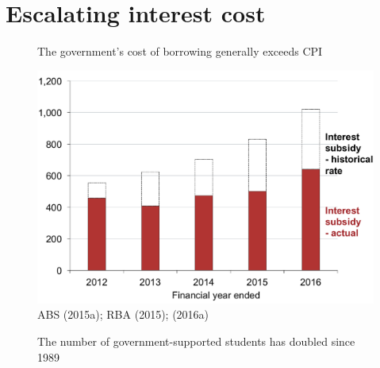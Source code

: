 \documentclass[embargoed]{grattan}
\begin{document}
\section{Escalating interest cost}\label{escalating-interest-cost}

\begin{figure}

\begin{minipage}[t][\textheight]{\columnwidth}
\vspace{\grattanfptop}
\caption[The government's cost of borrowing generally exceeds CPI]{The government's cost of borrowing generally exceeds \gls{CPI}}\label{fig:fig2-governments-cost-of-borrowing-exceeds-CPI}

\includegraphics[page=2]{atlas/Chartpack.pdf}
%
{ABS (2015a); RBA (2015); (2016a)}
\end{minipage} \hfill
\begin{minipage}[t][\textheight]{\columnwidth}
\vspace{\grattanfptop}
\caption{The number of government-supported students has doubled since 1989}\label{fig:fig3-number-govt-supported-students-doubled-since-1989}


\end{minipage}
\end{figure}
\end{document}
